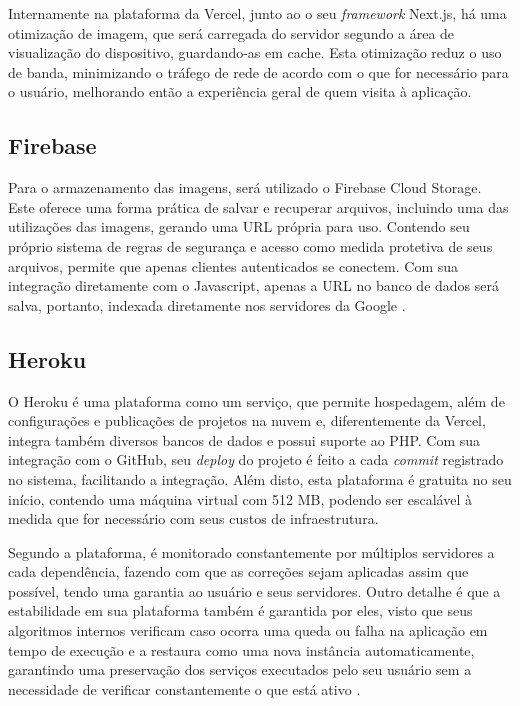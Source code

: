 Internamente na plataforma da Vercel, junto ao o seu \textit{framework} Next.js, há uma otimização de imagem, que será carregada do servidor segundo a área de visualização do dispositivo, guardando-as em cache. Esta otimização reduz o uso de banda, minimizando o tráfego de rede de acordo com o que for necessário para o usuário, melhorando então a experiência geral de quem visita à aplicação.

\subsection{Firebase}
Para o armazenamento das imagens, será utilizado o Firebase Cloud Storage. Este oferece uma forma prática de salvar e recuperar arquivos, incluindo uma das utilizações das imagens, gerando uma URL própria para uso. Contendo seu próprio sistema de regras de segurança e acesso como medida protetiva de seus arquivos, permite que apenas clientes autenticados se conectem. Com sua integração diretamente com o Javascript, apenas a URL no banco de dados será salva, portanto, indexada diretamente nos servidores da Google \cite{FIREBASE}.

\subsection{Heroku}
O Heroku é uma plataforma como um serviço, que permite hospedagem, além de configurações e publicações de projetos na nuvem e, diferentemente da Vercel, integra também diversos bancos de dados e possui suporte ao PHP. Com sua integração com o GitHub, seu \textit{deploy} do projeto é feito a cada \textit{commit} registrado no sistema, facilitando a integração. Além disto, esta plataforma é gratuita no seu início, contendo uma máquina virtual com 512 MB, podendo ser escalável à medida que for necessário com seus custos de infraestrutura. 

Segundo a plataforma, é monitorado constantemente por múltiplos servidores a cada dependência, fazendo com que as correções sejam aplicadas assim que possível, tendo uma garantia ao usuário e seus servidores.  Outro detalhe é que a estabilidade em sua plataforma também é garantida por eles, visto que seus algoritmos internos verificam caso ocorra uma queda ou falha na aplicação em tempo de execução e a restaura como uma nova instância automaticamente, garantindo uma preservação dos serviços executados pelo seu usuário sem a necessidade de verificar constantemente o que está ativo \cite{HEROKU}.

